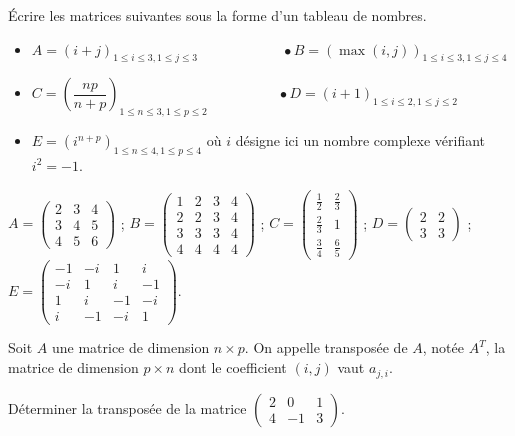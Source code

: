 \documentclass[11pt,fleqn]{book} %
\begin{document}
\begin{exercise}[topic=mat01]Écrire les matrices suivantes sous la forme d'un tableau de nombres.

\begin{itemize}
\item $A = ( i+j)_{1 \leqslant i \leqslant 3, 1\leqslant j \leqslant 3} \qquad \qquad \qquad \bullet B = ( \max (i,j))_{1 \leqslant i \leqslant 3, 1\leqslant j \leqslant 4}$
\vskip5pt
\item $C = \left( \dfrac{np}{n+p} \right) _{1 \leqslant n \leqslant 3, 1 \leqslant p \leqslant 2} \qquad \quad \qquad \bullet D = \left(  i+1 \right) _{1 \leqslant i \leqslant 2, 1 \leqslant j \leqslant 2}$
\vskip5pt
\item $E = (i^{n+p})_{1 \leqslant n \leqslant 4, 1 \leqslant p \leqslant 4}$ où $i$ désigne ici un nombre complexe vérifiant $i^2=-1$.
\end{itemize}\end{exercise}

\begin{solution}\(A = \begin{pmatrix} 2 & 3 & 4\\3&4&5 \\ 4&5&6 \end{pmatrix}\) ; \( B= \begin{pmatrix} 1 & 2 & 3 & 4 \\ 2 & 2 & 3 & 4 \\ 3 & 3 & 3 & 4 \\ 4&4&4&4\end{pmatrix} \) ; \(C = \begin{pmatrix} \frac{1}{2} & \frac{2}{3} \\ \frac{2}{3} & 1 \\ \frac{3}{4} & \frac{6}{5} \end{pmatrix}\) ; \( D = \begin{pmatrix} 2 &2 \\ 3&3\end{pmatrix}\) ;  \(E = \begin{pmatrix} -1 & -i & 1 & i \\ -i & 1 & i & -1 \\ 1 & i & -1 & -i \\ i & -1 & -i & 1 \end{pmatrix} \).\end{solution}

\begin{exercise}[topic=mat01]Soit $A$ une matrice de dimension $n \times p$. On appelle transposée de $A$, notée $A^T$, la matrice de dimension $p \times n$ dont le coefficient $(i,j)$ vaut $a_{j,i}$. 

Déterminer la transposée de la matrice $\begin{pmatrix}2 & 0 & 1  \\ 4 & -1 & 3  \end{pmatrix}$.\end{exercise}
\end{document}
